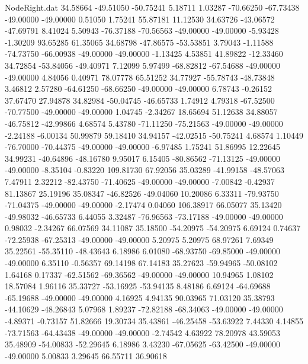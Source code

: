 \begin{filecontents}{NodeRight.dat}
  34.58664  -49.51050  -50.75241     5.18711    1.03287  -70.66250  -67.73438  -49.00000  -49.00000    0.51050    1.75241   55.87181   11.12530
  34.63726  -43.06572  -47.69791     8.41024    5.50943  -76.37188  -70.56563  -49.00000  -49.00000   -5.93428   -1.30209   93.65285   61.35065
  34.68798  -47.86575  -53.53851     3.79043   -1.11588  -74.73750  -66.00938  -49.00000  -49.00000   -1.13425    4.53851   41.89822  -12.33460
  34.72854  -53.84056  -49.40971     7.12099    5.97499  -68.82812  -67.54688  -49.00000  -49.00000    4.84056    0.40971   78.07778   65.51252
  34.77927  -55.78743  -48.73848     3.46812    2.57280  -64.61250  -68.66250  -49.00000  -49.00000    6.78743   -0.26152   37.67470   27.94878
  34.82984  -50.04745  -46.65733     1.74912    4.79318  -67.52500  -70.77500  -49.00000  -49.00000    1.04745   -2.34267   18.65694   51.12638
  34.88057  -46.75812  -42.99866     4.68574    5.43780  -71.11250  -75.21563  -49.00000  -49.00000   -2.24188   -6.00134   50.99879   59.18410
  34.94157  -42.02515  -50.75241     4.68574    1.10449  -76.70000  -70.44375  -49.00000  -49.00000   -6.97485    1.75241   51.86995   12.22645
  34.99231  -40.64896  -48.16780     9.95017    6.15405  -80.86562  -71.13125  -49.00000  -49.00000   -8.35104   -0.83220  109.81730   67.92056
  35.03289  -41.99158  -48.57063     7.47911    2.32212  -82.43750  -71.40625  -49.00000  -49.00000   -7.00842   -0.42937   81.13867   25.19196
  35.08347  -46.82526  -49.04060    10.20086    6.33311  -79.93750  -71.04375  -49.00000  -49.00000   -2.17474    0.04060  106.38917   66.05077
  35.13420  -49.98032  -46.65733     6.44055    3.32487  -76.96563  -73.17188  -49.00000  -49.00000    0.98032   -2.34267   66.07569   34.11087
  35.18500  -54.20975  -54.20975     6.69124    0.74637  -72.25938  -67.25313  -49.00000  -49.00000    5.20975    5.20975   68.97261    7.69349
  35.22561  -55.35110  -48.43643     6.18986    6.01080  -68.93750  -69.85000  -49.00000  -49.00000    6.35110   -0.56357   69.14198   67.14183
  35.27623  -59.94965  -50.08102     1.64168    0.17337  -62.51562  -69.36562  -49.00000  -49.00000   10.94965    1.08102   18.57084    1.96116
  35.33727  -53.16925  -53.94135     8.48186    6.69124  -64.69688  -65.19688  -49.00000  -49.00000    4.16925    4.94135   90.03965   71.03120
  35.38793  -44.10629  -48.26843     5.07968    1.89237  -72.82188  -68.34063  -49.00000  -49.00000   -4.89371   -0.73157   51.82666   19.30734
  35.43861  -46.25458  -53.63922     7.44330    4.14855  -73.71563  -64.43438  -49.00000  -49.00000   -2.74542    4.63922   78.20978   43.59053
  35.48909  -54.00833  -52.29645     6.18986    3.43230  -67.05625  -63.42500  -49.00000  -49.00000    5.00833    3.29645   66.55711   36.90618

\end{filecontents}
